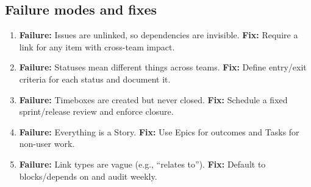 \subsection{Failure modes and fixes}
\begin{enumerate}
  \item \textbf{Failure:} Issues are unlinked, so dependencies are invisible. \textbf{Fix:} Require a link for any item with cross-team impact.
  \item \textbf{Failure:} Statuses mean different things across teams. \textbf{Fix:} Define entry/exit criteria for each status and document it.
  \item \textbf{Failure:} Timeboxes are created but never closed. \textbf{Fix:} Schedule a fixed sprint/release review and enforce closure.
  \item \textbf{Failure:} Everything is a Story. \textbf{Fix:} Use Epics for outcomes and Tasks for non-user work.
  \item \textbf{Failure:} Link types are vague (e.g., “relates to”). \textbf{Fix:} Default to blocks/depends on and audit weekly.
\end{enumerate}











